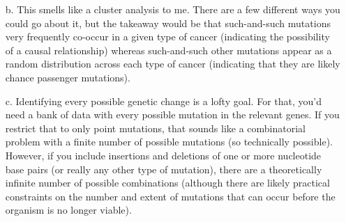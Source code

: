 \documentclass[11pt,final] {article}
\begin{document}
\begin{enumerate}
\begin{enumerate}
		\item[b.] This smells like a cluster analysis to me. There are a few different ways you could go about it, but the takeaway would be that such-and-such mutations very frequently co-occur in a given type of cancer (indicating the possibility of a causal relationship) whereas such-and-such other mutations appear as a random distribution across each type of cancer (indicating that they are likely chance passenger mutations).
		
		\item[c.] Identifying every possible genetic change is a lofty goal. For that, you'd need a bank of data with every possible mutation in the relevant genes. If you restrict that to only point mutations, that sounds like a combinatorial problem with a finite number of possible mutations (so technically possible). However, if you include insertions and deletions of one or more nucleotide base pairs (or really any other type of mutation), there are a theoretically infinite number of possible combinations (although there are likely practical constraints on the number and extent of mutations that can occur before the organism is no longer viable).
	\end{enumerate}
\end{enumerate}
\end{document}
